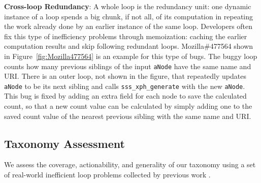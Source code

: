 {\textbf{Cross-loop Redundancy}}:
A whole loop is the redundancy unit:
one dynamic instance of a loop spends a big chunk, if not all, of its
computation in repeating the work already done by an
earlier instance of the same loop.
Developers often fix this type of inefficiency problems through memoization:
caching the earlier computation results and skip following redundant loops.
Mozilla\#477564 shown in Figure~\ref{fig:Mozilla477564} is an example for this type of bugs. 
The buggy loop counts how many previous siblings of the input \texttt{aNode} have the same name and URI. 
There is an outer loop, not shown in the figure, that repeatedly updates
\texttt{aNode} to be its next sibling and calls
\texttt{sss\_xph\_generate} with the new \texttt{aNode}. 
This bug is fixed by adding an extra field for each node to save the calculated 
count, so that a new count value can be calculated by simply adding one to the
saved count value of the nearest previous sibling with the same name and URI.

\subsection{Taxonomy Assessment}
\label{sec:tax_study}
We assess the coverage, actionability, and generality of our taxonomy using
a set of
real-world inefficient loop problems collected by previous work
\cite{SongOOPSLA2014,PerfBug}.

